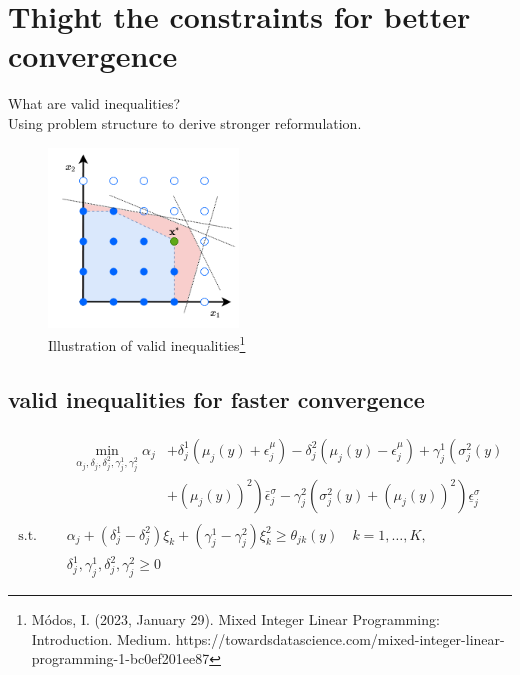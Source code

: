 \documentclass{beamer}
\begin{document}
\section{Thight the constraints for better convergence} %
\begin{frame}
	What are valid inequalities?\\
	Using problem structure to derive stronger reformulation.\\

	\begin{figure}[h]
		\centering
		\includegraphics[width=0.45\textwidth]{../figure/valid_ineq.png}
		\caption{Illustration of valid inequalities\footnote{\tiny Módos, I. (2023, January 29). Mixed Integer Linear Programming: Introduction. Medium. https://towardsdatascience.com/mixed-integer-linear-programming-1-bc0ef201ee87
		}}
		\label{fig:sample-image}
	\end{figure}
\end{frame}

\subsection{valid inequalities for faster convergence}
\begin{frame}
	\begin{equation}
		\begin{aligned}
		&\begin{aligned}
		\min _{\alpha_j, \delta_j, \delta_j^2, \gamma_j^1, \gamma_j^2} \alpha_j & +\delta_j^1\left(\mu_j(y)+\epsilon_j^\mu\right)-\delta_j^2\left(\mu_j(y)-\epsilon_j^\mu\right)+\gamma_j^1\left(\sigma_j^2(y)\right. \\
		& \left.+\left(\mu_j(y)\right)^2\right) \bar{\epsilon}_j^\sigma-\gamma_j^2\left(\sigma_j^2(y)+\left(\mu_j(y)\right)^2\right) \underline{\epsilon}_j^\sigma
		\end{aligned}\\
		\text { s.t. } \quad &\alpha_j+\left(\delta_j^1-\delta_j^2\right) \xi_k+\left(\gamma_j^1-\gamma_j^2\right) \xi_k^2 \geq \theta_{j k}(y) \quad k=1, \ldots, K \text {, }\\
		&\delta_j^1, \gamma_j^1, \delta_j^2, \gamma_j^2 \geq 0
		\end{aligned}
		\end{equation}
\end{frame}
\end{document}

